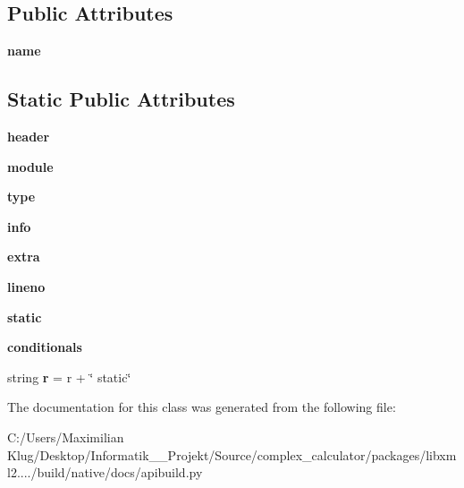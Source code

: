 \subsection*{Public Attributes}
\begin{DoxyCompactItemize}
\item 
\mbox{\label{classapibuild_1_1identifier_ab775bb4fb5f4bad75cc17db64430508a}} 
{\bfseries name}
\end{DoxyCompactItemize}
\subsection*{Static Public Attributes}
\begin{DoxyCompactItemize}
\item 
\mbox{\label{classapibuild_1_1identifier_a42e4e74c098ab5e8eba396f37f622e53}} 
{\bfseries header}
\item 
\mbox{\label{classapibuild_1_1identifier_af9ad29e007442c032afbd45a71536a0d}} 
{\bfseries module}
\item 
\mbox{\label{classapibuild_1_1identifier_abeecbb4294b2de279e4b0488ed569afb}} 
{\bfseries type}
\item 
\mbox{\label{classapibuild_1_1identifier_a82f3cd031788b06cc298fa6e7c0593db}} 
{\bfseries info}
\item 
\mbox{\label{classapibuild_1_1identifier_a6e424b779c908bb4d0547ddb935e1319}} 
{\bfseries extra}
\item 
\mbox{\label{classapibuild_1_1identifier_abb1933d0e9177357cfbd0843c3c2a3ce}} 
{\bfseries lineno}
\item 
\mbox{\label{classapibuild_1_1identifier_a41887fe8264468d5f1e9702c1e4ca3b9}} 
{\bfseries static}
\item 
\mbox{\label{classapibuild_1_1identifier_a3252827756bdc8c30f097805eecc641a}} 
{\bfseries conditionals}
\item 
\mbox{\label{classapibuild_1_1identifier_a9e46a077231ddfd20a5f2a82d7d7b2d3}} 
string {\bfseries r} = r + \char`\"{} static\char`\"{}
\end{DoxyCompactItemize}


The documentation for this class was generated from the following file\+:\begin{DoxyCompactItemize}
\item 
C\+:/\+Users/\+Maximilian Klug/\+Desktop/\+Informatik\+\_\+\_\+\+Projekt/\+Source/complex\+\_\+calculator/packages/libxml2..../build/native/docs/apibuild.\+py\end{DoxyCompactItemize}
